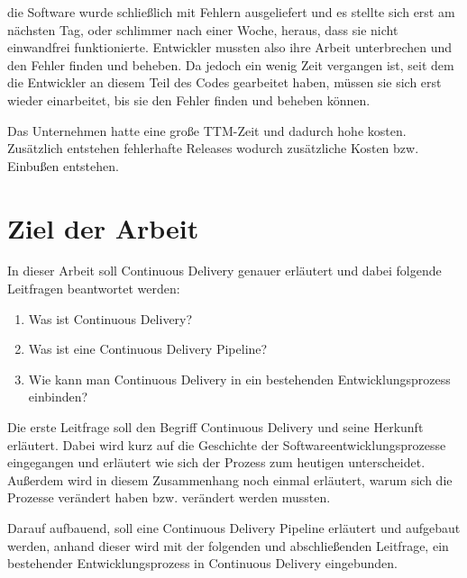 die Software wurde schließlich mit Fehlern ausgeliefert und es stellte sich erst am nächsten Tag, oder schlimmer nach einer Woche, heraus, dass sie nicht einwandfrei funktionierte. Entwickler mussten also ihre Arbeit unterbrechen und den Fehler finden und beheben. Da jedoch ein wenig Zeit vergangen ist, seit dem die Entwickler an diesem Teil des Codes gearbeitet haben, müssen sie sich erst wieder einarbeitet, bis sie den Fehler finden und beheben können.

Das Unternehmen hatte eine große TTM-Zeit und dadurch hohe kosten. Zusätzlich entstehen fehlerhafte Releases wodurch zusätzliche Kosten bzw. Einbußen entstehen.

\section{Ziel der Arbeit}
\label{sec:zielDerArbeit}
In dieser Arbeit soll Continuous Delivery genauer erläutert und dabei folgende Leitfragen beantwortet werden:

\begin{enumerate}
	\item Was ist Continuous Delivery?
    \item Was ist eine Continuous Delivery Pipeline?
	\item Wie kann man Continuous Delivery in ein bestehenden Entwicklungsprozess einbinden?
\end{enumerate}

Die erste Leitfrage soll den Begriff Continuous Delivery und seine Herkunft erläutert. Dabei wird kurz auf die Geschichte der Softwareentwicklungsprozesse eingegangen und erläutert wie sich der Prozess zum heutigen unterscheidet. Außerdem wird in diesem Zusammenhang noch einmal erläutert, warum sich die Prozesse verändert haben bzw. verändert werden mussten.

Darauf aufbauend, soll eine Continuous Delivery Pipeline erläutert und aufgebaut werden, anhand dieser wird mit der folgenden und abschließenden Leitfrage, ein bestehender Entwicklungsprozess in Continuous Delivery eingebunden.